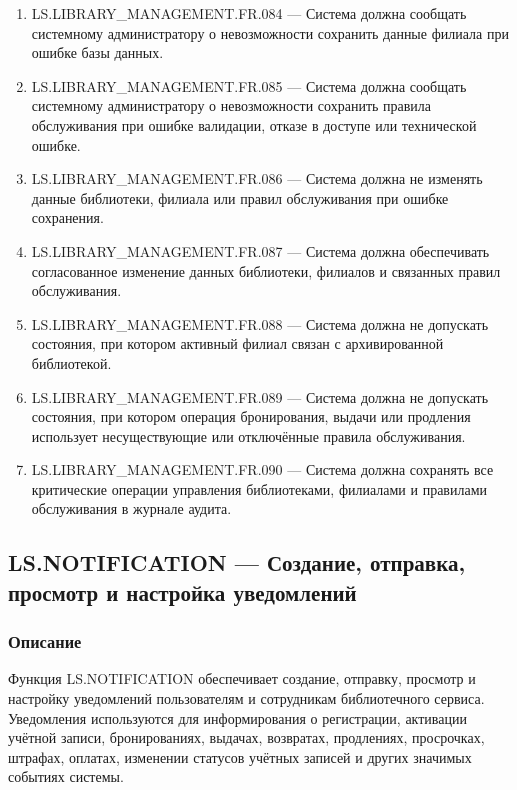 \documentclass[12pt,a4paper]{article}
\begin{document}
\begin{enumerate}
		\item LS.LIBRARY\_MANAGEMENT.FR.084 --- Система должна сообщать системному
		администратору о невозможности сохранить данные филиала при ошибке базы
		данных.
		
		\item LS.LIBRARY\_MANAGEMENT.FR.085 --- Система должна сообщать системному
		администратору о невозможности сохранить правила обслуживания при ошибке
		валидации, отказе в доступе или технической ошибке.
		
		\item LS.LIBRARY\_MANAGEMENT.FR.086 --- Система должна не изменять данные
		библиотеки, филиала или правил обслуживания при ошибке сохранения.
		
		\item LS.LIBRARY\_MANAGEMENT.FR.087 --- Система должна обеспечивать согласованное
		изменение данных библиотеки, филиалов и связанных правил обслуживания.
		
		\item LS.LIBRARY\_MANAGEMENT.FR.088 --- Система должна не допускать состояния,
		при котором активный филиал связан с архивированной библиотекой.
		
		\item LS.LIBRARY\_MANAGEMENT.FR.089 --- Система должна не допускать состояния,
		при котором операция бронирования, выдачи или продления использует несуществующие
		или отключённые правила обслуживания.
		
		\item LS.LIBRARY\_MANAGEMENT.FR.090 --- Система должна сохранять все критические
		операции управления библиотеками, филиалами и правилами обслуживания в журнале
		аудита.
	\end{enumerate}
	
	\subsection{LS.NOTIFICATION --- Создание, отправка, просмотр и настройка уведомлений}
	
	\subsubsection{Описание}
	
	Функция LS.NOTIFICATION обеспечивает создание, отправку, просмотр и настройку
	уведомлений пользователям и сотрудникам библиотечного сервиса. Уведомления
	используются для информирования о регистрации, активации учётной записи,
	бронированиях, выдачах, возвратах, продлениях, просрочках, штрафах, оплатах,
	изменении статусов учётных записей и других значимых событиях системы.
	
\end{document}
